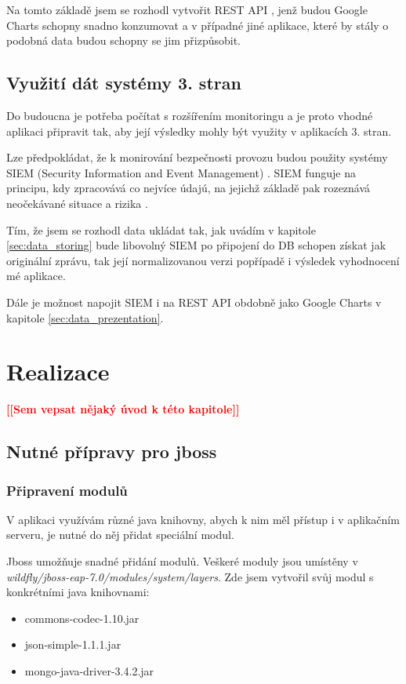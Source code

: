 \documentclass[thesis=M,czech]{FITthesis}[2012/10/20]
\newcommand{\todo}[1]{\textcolor{red}{\textbf{[[#1]]}}}
\begin{document}
		Na tomto základě jsem se rozhodl vytvořit REST API \cite{rest}, jenž budou Google Charts schopny snadno konzumovat a v případné jiné aplikace, které by stály o podobná data budou schopny se jim přizpůsobit.
		
	\section{Využití dát systémy 3. stran}
		Do budoucna je potřeba počítat s rozšířením monitoringu a je proto vhodné aplikaci připravit tak, aby její výsledky mohly být využity v aplikacích 3. stran.
		
		Lze předpokládat, že k monirování bezpečnosti provozu budou použity systémy SIEM (Security Information and Event Management) \cite{siem}.
		SIEM funguje na principu, kdy zpracovává co nejvíce údajú, na jejichž základě pak rozeznává neočekávané situace a rizika \cite{howDesSiemWork}.
		
		Tím, že jsem se rozhodl data ukládat tak, jak uvádím v kapitole \ref{sec:data_storing} bude libovolný SIEM po připojení do DB schopen získat jak originální zprávu, tak její normalizovanou verzi popřípadě i výsledek vyhodnocení mé aplikace.
		
		Dále je možnost napojit SIEM i na REST API obdobně jako Google Charts v kapitole \ref{sec:data_prezentation}.
		
\chapter{Realizace}
	\todo{Sem vepsat nějaký úvod k této kapitole}
	
	\section{Nutné přípravy pro jboss}
		\subsection{Připravení modulů}
		V aplikaci využívám různé java knihovny, abych k nim měl přístup i v aplikačním serveru, je nutné do něj přidat speciální modul.
		
		Jboss umožňuje snadné přidání modulů. Veškeré moduly jsou umístěny v \textit{wildfly/jboss-eap-7.0/modules/system/layers}. Zde jsem vytvořil svůj modul s konkrétními java knihovnami:
		\begin{itemize} 
			\item commons-codec-1.10.jar
			\item json-simple-1.1.1.jar
			\item mongo-java-driver-3.4.2.jar		
		\end{itemize}
		
\end{document}
